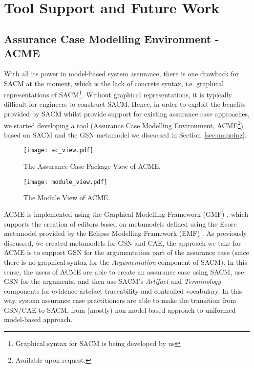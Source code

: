\section{Tool Support and Future Work}
\label{sec:toolsupport}
\subsection{Assurance Case Modelling Environment - ACME}
With all its power in model-based system assurance, there is one drawback for SACM at the moment, which is the lack of concrete syntax, i.e. graphical representations of SACM\footnote{Graphical syntax for SACM is being developed by us}. 
Without graphical representations, it is typically difficult for engineers to construct SACM. 
Hence, in order to exploit the benefits provided by SACM whilst provide support for existing assurance case approaches, we started developing a tool (Assurance Case Modelling Environment, ACME\footnote{Available upon request.}) based on SACM and the GSN metamodel we discussed in Section~\ref{sec:mapping}. 

\begin{figure}
	\centering
	\begin{minipage}[b]{0.49\textwidth}
		\texttt{[image: ac\_view.pdf]}
		\caption{The Assurance Case Package View of ACME.}
		\label{fig:ac_view}
	\end{minipage}
	\hfill
	\begin{minipage}[b]{0.49\textwidth}
		\texttt{[image: module\_view.pdf]}
		\caption{The Module View of ACME.}
		\label{fig:module_view}
	\end{minipage}
\end{figure}

ACME is implemented using the Graphical Modelling Framework (GMF) \cite{gmf}, which supports the creation of editors based on metamodels defined using the Ecore metamodel provided by the Eclipse Modelling Framework (EMF) \cite{steinberg2008emf}. 
As previously discussed, we created metamodels for GSN and CAE, the approach we take for ACME is to support GSN for the argumentation part of the assurance case (since there is no graphical syntax for the \textit{Argumentation} component of SACM).
In this sense, the users of ACME are able to create an assurance case using SACM, use GSN for the arguments, and then use SACM's \textit{Artifact} and \textit{Terminology} components for evidence-artefact traceability and controlled vocabulary. 
In this way, system assurance case practitioners are able to make the transition from GSN/CAE to SACM, from (mostly) non-model-based approach to uniformed model-based approach.

